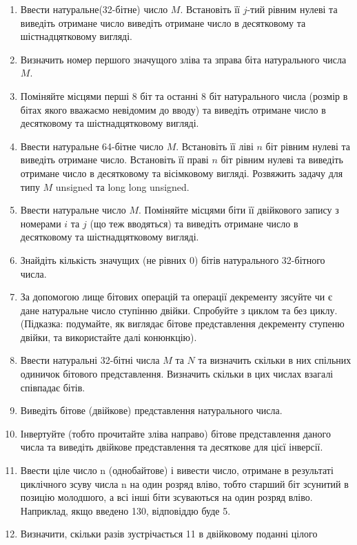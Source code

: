 \documentclass[]{article}
\begin{document}
\begin{enumerate}
\def\labelenumi{\arabic{enumi})}
\item
  Ввести натуральне(32-бітне) число $M$. Встановіть її $j$-тий рівним нулеві
  та виведіть отримане число виведіть отримане число в десятковому та
  шістнадцятковому вигляді.
\item
  Визначить номер першого значущого зліва та зправа біта натурального
  числа $M$.
\item
  Поміняйте місцями перші 8 біт та останні 8 біт натурального числа
  (розмір в бітах якого вважаємо невідомим до вводу) та виведіть
  отримане число в десятковому та шістнадцятковому вигляді.
\item
  Ввести натуральне 64-бітне число $M$. Встановіть її ліві $n$ біт рівним
  нулеві та виведіть отримане число. Встановіть її праві $n$ біт рівним
  нулеві та виведіть отримане число в десятковому та вісімковому
  вигляді. Розвяжить задачу для типу $M$ unsigned та long long unsigned.
\item
  Ввести натуральне число $M$. Поміняйте місцями біти її двійкового запису
  з номерами $i$ та $j$ (що теж вводяться) та виведіть отримане число в
  десятковому та шістнадцятковому вигляді.
\item
  Знайдіть кількість значущих (не рівних 0) бітів натурального
  32-бітного числа.
\item
  За допомогою лище бітових операцій та операції декременту зясуйте чи є
  дане натуральне число ступінню двійки. Спробуйте з циклом та без
  циклу. (Підказка: подумайте, як виглядає бітове представлення
  декременту ступеню двійки, та використайте далі конюнкцію).
\item
  Ввести натуральні 32-бітні числа $M$ та $N$ та визначить скільки в них
  спільних одиничок бітового представлення. Визначить скільки в цих
  числах взагалі співпадає бітів.
\item
  Виведіть бітове (двійкове) представлення натурального числа.
\item
  Інвертуйте (тобто прочитайте зліва направо) бітове представлення
  даного числа та виведіть двійкове представлення та десяткове для цієї
  інверсії.
\item
  Ввести ціле число n (однобайтове) і вивести число, отримане в
  результаті циклічного зсуву числа n на один розряд вліво, тобто
  старший біт зсунитий в позицію молодшого, а всі інші біти зсуваються
  на один розряд вліво. Наприклад, якщо введено 130, відповіддю буде 5.
\item
  Визначити, скільки разів зустрічається 11 в двійковому поданні цілого

\end{enumerate}
\end{document}
